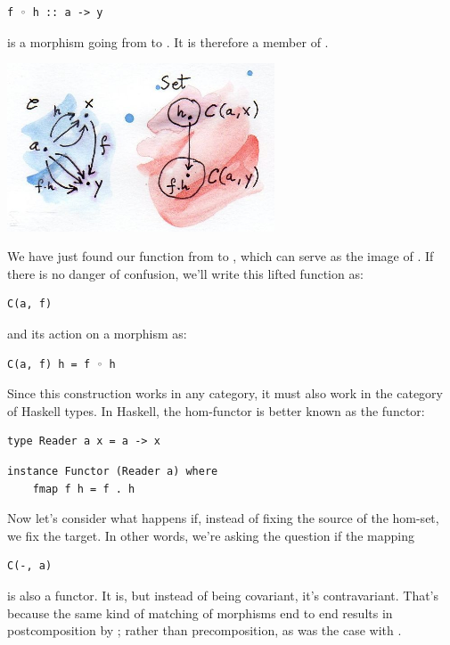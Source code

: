 \begin{Verbatim}[commandchars=\\\{\}]
f ◦ h :: a -> y
\end{Verbatim}
is a morphism going from  to . It is therefore a
member of .

\includegraphics[width=3.12500in]{images/hom-functor.jpg}

We have just found our function from  to
, which can serve as the image of . If there
is no danger of confusion, we'll write this lifted function as:

\begin{Verbatim}[commandchars=\\\{\}]
C(a, f)
\end{Verbatim}
and its action on a morphism  as:

\begin{Verbatim}[commandchars=\\\{\}]
C(a, f) h = f ◦ h
\end{Verbatim}
Since this construction works in any category, it must also work in the
category of Haskell types. In Haskell, the hom-functor is better known
as the  functor:

\begin{Verbatim}[commandchars=\\\{\}]
type Reader a x = a -> x
\end{Verbatim}
\begin{Verbatim}[commandchars=\\\{\}]
instance Functor (Reader a) where
    fmap f h = f . h
\end{Verbatim}
Now let's consider what happens if, instead of fixing the source of the
hom-set, we fix the target. In other words, we're asking the question if
the mapping

\begin{Verbatim}[commandchars=\\\{\}]
C(-, a)
\end{Verbatim}
is also a functor. It is, but instead of being covariant, it's
contravariant. That's because the same kind of matching of morphisms end
to end results in postcomposition by ; rather than
precomposition, as was the case with .

